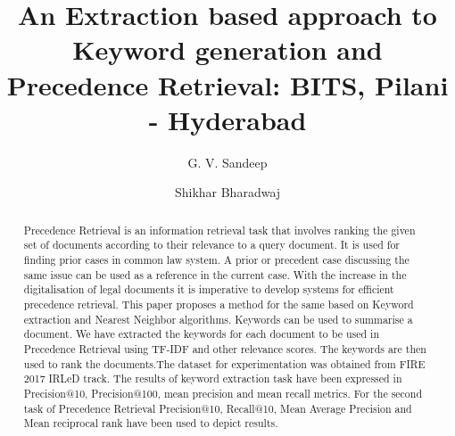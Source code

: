 \documentclass[sigconf]{acmart}
\begin{document}
\title[An Extraction based approach to Keyword generation and Precedence Retrieval]{An Extraction based approach to Keyword generation and Precedence Retrieval: BITS, Pilani - Hyderabad}


\author{G. V. Sandeep}

\author{Shikhar Bharadwaj}

\begin{abstract}
Precedence Retrieval is an information retrieval task that involves ranking the given set of documents according to their relevance to a query document. It is used for finding prior cases in common law system. A prior or precedent case discussing the same issue can be used as a reference in the current case. With the increase in the digitalisation of legal documents it is imperative to develop systems for efficient precedence retrieval. This paper proposes a method for the same based on Keyword extraction and Nearest Neighbor algorithms. Keywords can be used to summarise a document. We have extracted the keywords for each document to be used in Precedence Retrieval using TF-IDF and other relevance scores. The keywords are then used to rank the documents.The dataset for experimentation was obtained from FIRE 2017 IRLeD track\cite{fire2017-irled}. The results of keyword extraction task have been expressed in Precision@10, Precision@100, mean precision and mean recall metrics. For the second task of Precedence Retrieval Precision@10, Recall@10, Mean Average Precision and Mean reciprocal rank have been used to depict results.

\end{abstract}



\maketitle




 
\end{document}
